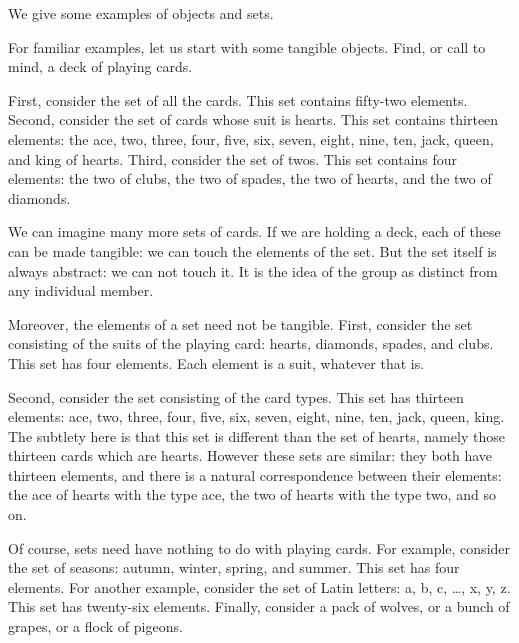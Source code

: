 

We give some examples of objects and sets.


For familiar examples,
let us start
with some tangible
objects.
Find, or call to
mind,
a deck
of playing cards.

First, consider
the set of all
the cards.
This set contains
fifty-two elements.
Second, consider
the set of cards
whose suit is hearts.
This set contains
thirteen elements:
the ace, two, three, four, five,
six, seven, eight, nine, ten,
jack, queen, and
king of hearts.
Third, consider
the set of twos.
This set contains
four elements:
the two of clubs,
the two of spades,
the two of hearts,
and the two of diamonds.

We can imagine many
more sets of cards.
If we are holding a deck,
each of these can be
made tangible: we can
touch the elements of
the set.
But the set itself
is always abstract:
we can not touch it.
It is the idea of the
group as distinct from
any individual member.

Moreover, the
elements of a set
need not be tangible.
First, consider the set
consisting of the suits of
the playing card:
hearts, diamonds, spades, and clubs.
This set has four elements.
Each element is a suit, whatever that is.

Second, consider the set
consisting of the card types.
This set has thirteen elements:
ace, two, three, four, five,
six, seven, eight, nine, ten,
jack, queen, king.
The subtlety here is that
this set is different than
the set of hearts, namely
those thirteen cards which are
hearts.
However these sets are
similar: they both have thirteen
elements, and there is a natural
correspondence between their
elements: the ace of hearts
with the type ace, the two
of hearts with the type two,
and so on.

Of course, sets need have nothing to
do with playing cards.
For example, consider the set of
seasons: autumn, winter, spring,
and summer.
This set has four elements.
For another example,
consider the set of Latin letters:
a, b, c, \dots, x, y, z.
This set has twenty-six elements.
Finally, consider a pack of wolves, or a bunch of grapes, or a flock of pigeons.

